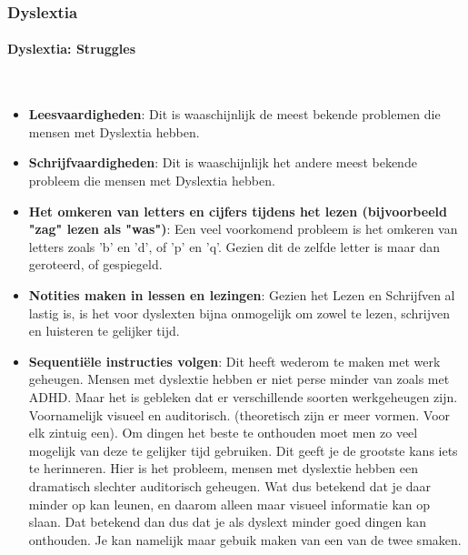             \subsubsection{Dyslextia}
            
                \paragraph{Dyslextia: Struggles}\\
                \begin{itemize}
                    \item \textbf{Leesvaardigheden}\cite{dyslextia-struggles-and-superpowers}:
                        Dit is waaschijnlijk de meest bekende problemen die mensen met Dyslextia hebben. 

                    \item \textbf{Schrijfvaardigheden}:
                        Dit is waaschijnlijk het andere meest bekende probleem die mensen met Dyslextia hebben.
                        
                    \item \textbf{Het omkeren van letters en cijfers tijdens het lezen (bijvoorbeeld "zag" lezen als "was")}\cite{dyslextia-struggles-and-superpowers}:
                        Een veel voorkomend probleem is het omkeren van letters zoals 'b' en 'd', of 'p' en 'q'. Gezien dit de zelfde letter is maar dan geroteerd, of gespiegeld.
                        
                    \item \textbf{Notities maken in lessen en lezingen}\cite{dyslextia-struggles-and-superpowers}:
                        Gezien het Lezen en Schrijfven al lastig is, is het voor dyslexten bijna onmogelijk om zowel te lezen, schrijven en luisteren te gelijker tijd.
                    
                    \item \textbf{Sequentiële instructies volgen}\cite{dyslextia-struggles-and-superpowers}:
                        Dit heeft wederom te maken met werk geheugen. Mensen met dyslextie hebben er niet perse minder van zoals met ADHD. Maar het is gebleken dat er verschillende soorten werkgeheugen zijn\cite{dyslextia-different-types-of-memory}. Voornamelijk visueel en auditorisch. (theoretisch zijn er meer vormen. Voor elk zintuig een). Om dingen het beste te onthouden moet men zo veel mogelijk van deze te gelijker tijd gebruiken. Dit geeft je de grootste kans iets te herinneren. Hier is het probleem, mensen met dyslextie hebben een dramatisch slechter auditorisch geheugen. Wat dus betekend dat je daar minder op kan leunen, en daarom alleen maar visueel informatie kan op slaan. Dat betekend dan dus dat je als dyslext minder goed dingen kan onthouden. Je kan namelijk maar gebuik maken van een van de twee smaken.
                        

\end{itemize}

